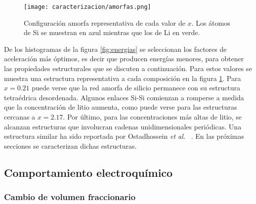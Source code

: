 \begin{figure}[th]
    \centering
    \texttt{[image: caracterizacion/amorfas.png]}
    \caption{Configuración amorfa representativa de cada valor de $x$. Los átomos
    de Si se muestran en azul mientras que los de Li en verde.}
    \label{fig:amorfas}
\end{figure}
De los histogramas de la figura \ref{fig:energias} se seleccionan los factores 
de aceleración más óptimos, es decir que producen energías menores, para obtener
las propiedades estructurales que se discuten a continuación. Para estos valores
se muestra una estructura representativa a cada composición en la figura 
\ref{fig:amorfas}. Para $x = 0.21$ puede verse que la red amorfa de silicio
permanece con su estructura tetraédrica desordenada. Algunos enlaces Si-Si 
comienzan a romperse a medida que la concentración de litio aumenta, como puede
verse para las estructuras cercanas a $x = 2.17$. Por último, para las 
concentraciones más altas de litio, se alcanzan estructuras que involucran cadenas 
unidimensionales periódicas. Una estructura similar ha sido reportada por 
Ostadhossein \textit{et al.} ~\cite{ostadhossein2015}. En las próximas secciones
se caracterizan dichas estructuras.

\subsection{Comportamiento electroquímico}

\subsubsection{Cambio de volumen fraccionario}

